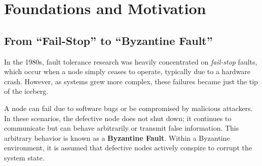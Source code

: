 \section{Foundations and Motivation}

\subsection{From ``Fail-Stop'' to ``Byzantine Fault''}
In the 1980s, fault tolerance research was heavily concentrated on \textit{fail-stop} faults, which occur when a node simply ceases to operate, typically due to a hardware crash. However, as systems grew more complex, these failures became just the tip of the iceberg. 

A node can fail due to software bugs or be compromised by malicious attackers. In these scenarios, the defective node does not shut down; it continues to communicate but can behave arbitrarily or transmit false information. This arbitrary behavior is known as a \textbf{Byzantine Fault}. Within a Byzantine environment, it is assumed that defective nodes actively conspire to corrupt the system state.

